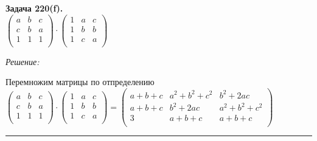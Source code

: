 \documentclass[a4paper, 12pt]{article}
\newenvironment{problem}[2][Задача]
    { \begin{mdframed}[backgroundcolor=gray!10] \textbf{#1 #2.} \\}
    {  \end{mdframed}}
\newenvironment{solution}
    {\textit{Решение: }}
    {\noindent\rule{7in}{1.5pt}}
\begin{document}
\begin{problem}{220(f)}
$\left(
\begin{array}{rrr}
a & b & c \\
c & b & a \\
1 & 1 & 1 \\
\end{array}
\right)
\cdot
\left(
\begin{array}{rrr}
1 & a & c \\
1 & b & b \\
1 & c & a \\
\end{array}
\right)
$

\end{problem}
\begin{solution}

Перемножим матрицы по отпределению \\
$\left(
\begin{array}{rrr}
a & b & c \\
c & b & a \\
1 & 1 & 1 \\
\end{array}
\right)
\cdot
\left(
\begin{array}{rrr}
1 & a & c \\
1 & b & b \\
1 & c & a \\
\end{array}
\right)
=
\left(
\begin{array}{rrr}
a + b + c & a^2 + b^2 + c^2 & b^2 + 2ac \\
a + b + c  & b^2 + 2ac & a^2 + b^2 + c^2 \\
3 & a + b + c & a + b + c \\
\end{array}
\right)
$

\end{solution}
\end{document}
